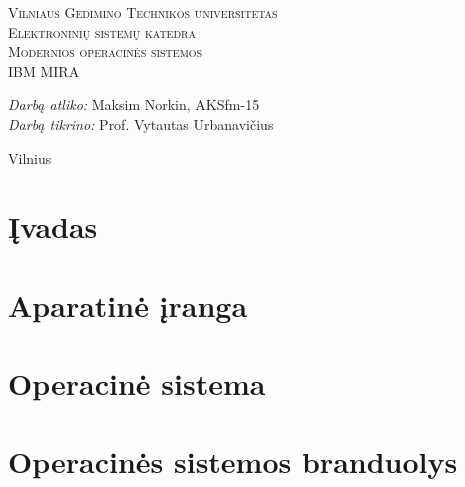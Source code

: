 \documentclass[12pt,a4paper]{article}
\begin{document}
\begin{titlepage}
  
  \begin{center}
    \textsc{\LARGE Vilniaus Gedimino Technikos universitetas}\\[2mm]
    \textsc{\Large Elektroninių sistemų katedra}\\[70mm]
    \textsc{\Large Modernios operacinės sistemos}\\[10mm]
    \textsc{\normalsize IBM MIRA}\\[40mm]
    \begin{minipage}{1\textwidth}
      \begin{flushright}
        \emph{Darbą atliko:} Maksim Norkin, AKSfm-15\\
        \emph{Darbą tikrino:} Prof. Vytautas Urbanavičius\\
      \end{flushright}
    \end{minipage}
    \vfill
    {\large Vilnius \\ \the\year}
  \end{center}
\end{titlepage}
\tableofcontents
\newpage


\section{Įvadas}



\section{Aparatinė įranga}



\section{Operacinė sistema}



\section{Operacinės sistemos branduolys}


\end{document}
